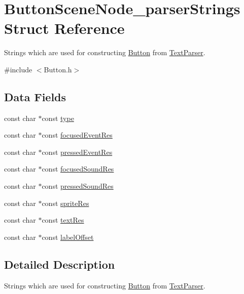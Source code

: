 \hypertarget{struct_button_scene_node__parser_strings}{}\section{Button\+Scene\+Node\+\_\+parser\+Strings Struct Reference}
\label{struct_button_scene_node__parser_strings}


Strings which are used for constructing \hyperlink{struct_button}{Button} from \hyperlink{struct_text_parser}{Text\+Parser}.  




{\ttfamily \#include $<$Button.\+h$>$}

\subsection*{Data Fields}
\begin{DoxyCompactItemize}
\item 
const char $\ast$const \hyperlink{struct_button_scene_node__parser_strings_a8ff938fb2f815be425fd2859a21e6d61}{type}
\item 
const char $\ast$const \hyperlink{struct_button_scene_node__parser_strings_aab416a914f7b3b4514bd5cf98c4558a8}{focused\+Event\+Res}
\item 
const char $\ast$const \hyperlink{struct_button_scene_node__parser_strings_aa63f78ed02ab8fb2518965ba94954854}{pressed\+Event\+Res}
\item 
const char $\ast$const \hyperlink{struct_button_scene_node__parser_strings_a657d14ed5cdb24ab74adbd963640824b}{focused\+Sound\+Res}
\item 
const char $\ast$const \hyperlink{struct_button_scene_node__parser_strings_a5257ecd9dcd85813b88cb459d9bd8a81}{pressed\+Sound\+Res}
\item 
const char $\ast$const \hyperlink{struct_button_scene_node__parser_strings_a008090dd7a5af169656ea5a85a437385}{sprite\+Res}
\item 
const char $\ast$const \hyperlink{struct_button_scene_node__parser_strings_ab8666a8039b6fdab629c3e0853421c3c}{text\+Res}
\item 
const char $\ast$const \hyperlink{struct_button_scene_node__parser_strings_ae4be9330e3ecb371dd29fe7c0851c565}{label\+Offset}
\end{DoxyCompactItemize}


\subsection{Detailed Description}
Strings which are used for constructing \hyperlink{struct_button}{Button} from \hyperlink{struct_text_parser}{Text\+Parser}. 

